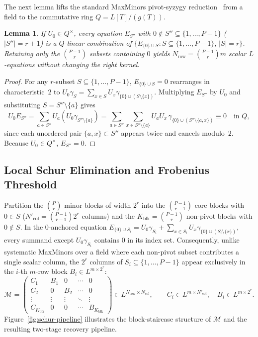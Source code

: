 \documentclass[11pt,a4paper]{article}
\newtheorem{lemma}[theorem]{Lemma}
\theoremstyle{definition}
\theoremstyle{remark}
\begin{document}
The next lemma lifts the standard MaxMinors pivot-syzygy reduction~\cite{BBC+20,BBGT23} from a field to the commutative ring $Q = L[T]/(g(T))$.

\begin{lemma}
\label{lem:row-complete}
If $U_0 \in Q^\times$, every equation $E_{S''}$ with $0 \notin S'' \subseteq \{1, \dots, P-1\}$ ($|S''| = r+1$) is a $Q$-linear combination of $\{E_{\{0\} \cup S} : S \subseteq \{1, \dots, P-1\},\, |S| = r\}$. Retaining only the $\binom{P-1}{r}$ subsets containing $0$ yields $N_{\text{row}} = \binom{P-1}{r} m$ scalar $L$-equations without changing the right kernel.
\end{lemma}

\begin{proof}
For any $r$-subset $S \subseteq \{1, \dots, P-1\}$, $E_{\{0\} \cup S} = 0$ rearranges in characteristic~$2$ to $U_0 \gamma_S = \sum_{x \in S} U_x \gamma_{\{0\} \cup (S \setminus \{x\})}$. Multiplying $E_{S''}$ by $U_0$ and substituting $S = S'' \setminus \{a\}$ gives
\[
    U_0 E_{S''} = \sum_{a \in S''} U_a (U_0 \gamma_{S'' \setminus \{a\}})
    = \sum_{a \in S''} \sum_{x \in S'' \setminus \{a\}} U_a U_x \, \gamma_{\{0\} \cup (S'' \setminus \{a, x\})} \equiv 0 \quad \text{in } Q,
\]
since each unordered pair $\{a, x\} \subset S''$ appears twice and cancels modulo~$2$. Because $U_0 \in Q^\times$, $E_{S''} = 0$.
\end{proof}

\subsection{Local Schur Elimination and Frobenius Threshold}
\label{subsec:ct-schur}

Partition the $\binom{P}{r}$ minor blocks of width $2^r$ into the $\binom{P-1}{r-1}$ core blocks with $0 \in S$ ($N'_{\text{col}} = \binom{P-1}{r-1}2^r$ columns) and the $K_{\text{blk}} = \binom{P-1}{r}$ non-pivot blocks with $0 \notin S$. In the $0$-anchored equation $E_{\{0\} \cup S_i} = U_0 \gamma_{S_i} + \sum_{x \in S_i} U_x \gamma_{\{0\} \cup (S_i \setminus \{x\})}$, every summand except $U_0 \gamma_{S_i}$ contains $0$ in its index set. Consequently, unlike systematic MaxMinors over a field where each non-pivot subset contributes a single scalar column, the $2^r$ columns of $S_i \subseteq \{1, \dots, P-1\}$ appear exclusively in the $i$-th $m$-row block $B_i \in L^{m \times 2^r}$:
\begin{equation}
\label{eq:block-staircase}
    \mathcal{M} = \begin{pmatrix}
        C_1 & B_1 & 0 & \cdots & 0 \\
        C_2 & 0 & B_2 & \cdots & 0 \\
        \vdots & \vdots & \vdots & \ddots & \vdots \\
        C_{K_{\text{blk}}} & 0 & 0 & \cdots & B_{K_{\text{blk}}}
    \end{pmatrix} \in L^{N_{\text{row}} \times N_{\text{col}}}, \qquad
    C_i \in L^{m \times N'_{\text{col}}},\quad B_i \in L^{m \times 2^r}.
\end{equation}
Figure~\ref{fig:schur-pipeline} illustrates the block-staircase structure of $\mathcal{M}$ and the resulting two-stage recovery pipeline.
\end{document}
